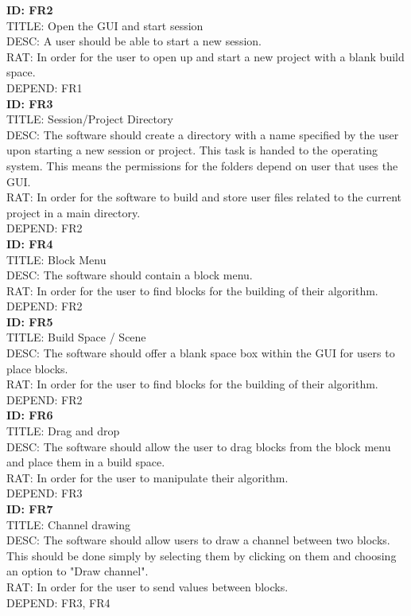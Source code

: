 \documentclass[journal,10pt,onecolumn,compsoc]{IEEEtran} \usepackage[margin=1.0in]{geometry} \usepackage{pdfpages} \usepackage{graphicx}
\begin{document}
\noindent
\textbf{ID: FR2}\\
TITLE: Open the GUI and start session\\
DESC: A user should be able to start a new session. \\
RAT: In order for the user to open up and start a new project with a blank build space.\\
DEPEND: FR1\\

\noindent
\textbf{ID: FR3}\\
TITLE: Session/Project Directory\\
DESC: The software should create a directory with a name specified by the user upon starting a new session or project.
This task is handed to the operating system. This means the permissions for the folders depend on user that uses the GUI. \\
RAT: In order for the software to build and store user files related to the current project in a main directory.\\
DEPEND: FR2\\

\noindent
\textbf{ID: FR4}\\
TITLE: Block Menu\\
DESC: The software should contain a block menu.\\
RAT: In order for the user to find blocks for the building of their algorithm.\\
DEPEND: FR2\\

\noindent
\textbf{ID: FR5}\\
TITLE: Build Space / Scene\\
DESC: The software should offer a blank space box within the GUI for users to place blocks.\\
RAT: In order for the user to find blocks for the building of their algorithm.\\
DEPEND: FR2\\

\noindent
\textbf{ID: FR6}\\
TITLE: Drag and drop\\
DESC: The software should allow the user to drag blocks from the block menu and place them in a build space.\\
RAT: In order for the user to manipulate their algorithm.\\
DEPEND: FR3\\

\noindent
\textbf{ID: FR7}\\
TITLE: Channel drawing\\
DESC: The software should allow users to draw a channel between two blocks. 
This should be done simply by selecting them by clicking on them and choosing an option to "Draw channel".\\
RAT: In order for the user to send values between blocks.\\
DEPEND: FR3, FR4\\
\end{document}
